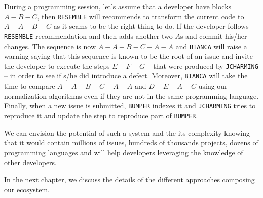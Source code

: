 During a programming session, let's assume that a developer have blocks $A-B-C$, then {\tt RESEMBLE} will recommends to transform the current code to $A-A-B-C$ as it seams to be the right thing to do. 
If the developer follows {\tt RESEMBLE} recommendation and then adds another two $A$s and commit his/her changes.
The sequence is now $A-A-B-C-A-A$ and {\tt BIANCA} will raise a warning saying that this sequence is known to be the root of an issue and invite the developer to execute the steps $E-F-G$ -- that were produced by {\tt JCHARMING} -- in order to see if s/he did introduce a defect. Moreover, {\tt BIANCA} will take the time to compare $A-A-B-C-A-A$ and $D-E-A-C$ using our normalization algorithms even if they are not in the same programming language. 
Finally, when a new issue is submitted, {\tt BUMPER} indexes it and {\tt JCHARMING} tries to reproduce it and update the step to reproduce part of {\tt BUMPER}.

We can envision the potential of such a system and the its complexity knowing that it would contain millions of issues, hundreds of thousands projects, dozens of programming languages and will help developers leveraging the knowledge of other developers.

In the next chapter, we discuss the details of the different approaches composing our ecosystem.
